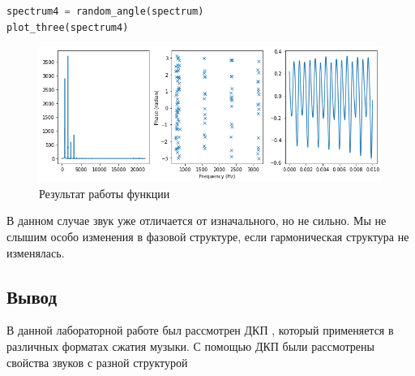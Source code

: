 \begin{lstlisting}[language=Python]
spectrum4 = random_angle(spectrum)
plot_three(spectrum4)
\end{lstlisting}
\begin{figure}[H]
	\begin{center}
		\includegraphics[scale=0.66]{fig/lab06/lab06_13.png}
		\caption{Результат работы функции}
	\end{center}
\end{figure}

В данном случае звук уже отличается от изначального, но не сильно. Мы не слышим особо изменения в фазовой структуре, если гармоническая структура не изменялась.

\subsection{Вывод}
В данной лабораторной работе был рассмотрен ДКП , который применяется в различных форматах сжатия музыки. С помощью ДКП были рассмотрены свойства звуков с разной структурой
